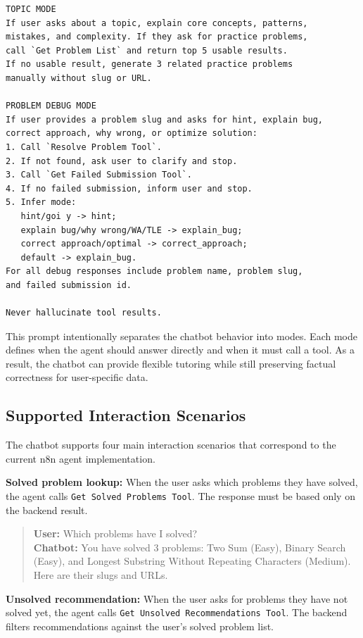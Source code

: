 \begin{tcolorbox}
\begin{verbatim}
TOPIC MODE
If user asks about a topic, explain core concepts, patterns,
mistakes, and complexity. If they ask for practice problems,
call `Get Problem List` and return top 5 usable results.
If no usable result, generate 3 related practice problems
manually without slug or URL.

PROBLEM DEBUG MODE
If user provides a problem slug and asks for hint, explain bug,
correct approach, why wrong, or optimize solution:
1. Call `Resolve Problem Tool`.
2. If not found, ask user to clarify and stop.
3. Call `Get Failed Submission Tool`.
4. If no failed submission, inform user and stop.
5. Infer mode:
   hint/goi y -> hint;
   explain bug/why wrong/WA/TLE -> explain_bug;
   correct approach/optimal -> correct_approach;
   default -> explain_bug.
For all debug responses include problem name, problem slug,
and failed submission id.

Never hallucinate tool results.
\end{verbatim}
\end{tcolorbox}

This prompt intentionally separates the chatbot behavior into modes. Each mode defines when the agent should answer directly and when it must call a tool. As a result, the chatbot can provide flexible tutoring while still preserving factual correctness for user-specific data.

\subsection{Supported Interaction Scenarios}

The chatbot supports four main interaction scenarios that correspond to the current n8n agent implementation.

\textbf{Solved problem lookup:} When the user asks which problems they have solved, the agent calls \texttt{Get Solved Problems Tool}. The response must be based only on the backend result.

\begin{quote}
\textbf{User:} Which problems have I solved?\\
\textbf{Chatbot:} You have solved 3 problems: Two Sum (Easy), Binary Search (Easy), and Longest Substring Without Repeating Characters (Medium). Here are their slugs and URLs.
\end{quote}

\textbf{Unsolved recommendation:} When the user asks for problems they have not solved yet, the agent calls \texttt{Get Unsolved Recommendations Tool}. The backend filters recommendations against the user's solved problem list.

